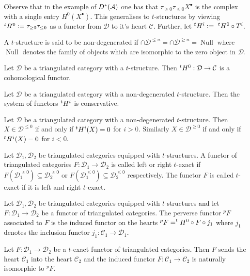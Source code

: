 Observe that in the example of $D^*(\AA)$ one has that $\tau_{\geq 0} \tau_{\leq 0} X^\bullet$ is the complex with a single entry $H^0(X^\bullet)$.
This generalises to $t$-structures by viewing $\tH^0:= \tau_{\geq 0}\tau_{\leq 0}$ as a functor from $\mathcal{D}$ to it's heart $\mathcal{C}$.
Further, let $\tH^i:=\ \tH^0 \circ T^i$.
\begin{definition}
 A $t$-structure is said to be non-degenerated if $\cap \mathcal{D}^{\leq n} = \cap \mathcal{D}^{\geq n}= \operatorname{Null}$ where $\operatorname{Null}$ denotes the family of objects which are isomorphic to the zero object in $\mathcal{D}$.
\end{definition}
\begin{proposition}{\cite[Chapter 5]{dimca2004sheaves}}
 Let $\mathcal{D}$ be a triangulated category with a $t$-structure. Then $\tH^0:\mathcal{D}\to \mathcal{C}$ is a cohomological functor.
\end{proposition}
\begin{proposition}{\cite[Chapter 5]{dimca2004sheaves}}
 Let $\mathcal{D}$ be a triangulated category with a non-degenerated $t$-structure. Then the system of functors $\tH^i$ is conservative.
\end{proposition}
\begin{proposition}{\cite[Chapter 5]{dimca2004sheaves}}\label{prop: tStructCohomD}
  Let $\mathcal{D}$ be a triangulated category with a non-degenerated $t$-structure.
  Then $X\in \mathcal{D}^{\leq 0}$ if and only if $\tH^i(X) = 0$ for $i>0$. Similarly $X\in \mathcal{D}^{\geq 0}$ if and only if $\tH^i(X)= 0$ for $i<0$.
\end{proposition}
\begin{definition}
 Let $\mathcal{D}_1,\mathcal{D}_2$ be triangulated categories equipped with $t$-structures. A functor of triangulated categories $F:\mathcal{D}_1\to \mathcal{D}_2$ is called left or right $t$-exact if $F(\mathcal{D}_1^{\geq 0}) \subseteq \mathcal{D}_2^{\geq 0}$ or $F(\mathcal{D}_1^{\leq 0}) \subseteq \mathcal{D}_2^{\leq 0}$ respectively.
 The functor $F$ is called $t$-exact if it is left and right $t$-exact.
\end{definition}
\begin{definition}
 Let $\mathcal{D}_1,\mathcal{D}_2$ be triangulated categories equipped with $t$-structures and let $F:\mathcal{D}_1 \to \mathcal{D}_2$ be a functor of triangulated categories.
 The perverse functor $^pF$ associated to $F$ is the induced functor on the hearts $^pF = \tH^0 \circ F \circ j_1$ where $j_1$ denotes the inclusion functor $j_1:\mathcal{C}_1\to \mathcal{D}_1$.
\end{definition}
\begin{proposition}{\cite[Chapter 5]{dimca2004sheaves}}\label{prop: FunctorHeart}
  Let $F:\mathcal{D}_1 \to \mathcal{D}_2$ be a $t$-exact functor of triangulated categories. Then $F$ sends the heart $\mathcal{C}_1$ into the heart $\mathcal{C}_2$ and the induced functor $F:\mathcal{C}_1 \to \mathcal{C}_2$ is naturally isomorphic to $^pF$.
\end{proposition}
